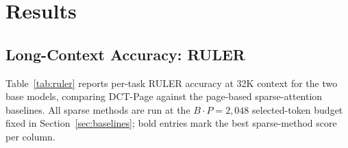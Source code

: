 \chapter{Results}\label{chap:results}


\section{Long-Context Accuracy: RULER}\label{sec:results-ruler}

Table~\ref{tab:ruler} reports per-task RULER accuracy at 32K context
for the two base models, comparing DCT-Page against the page-based
sparse-attention baselines.  All sparse methods are run at the
$B \cdot P = 2{,}048$ selected-token budget fixed in
Section~\ref{sec:baselines}; bold entries mark the best sparse-method
score per column.

